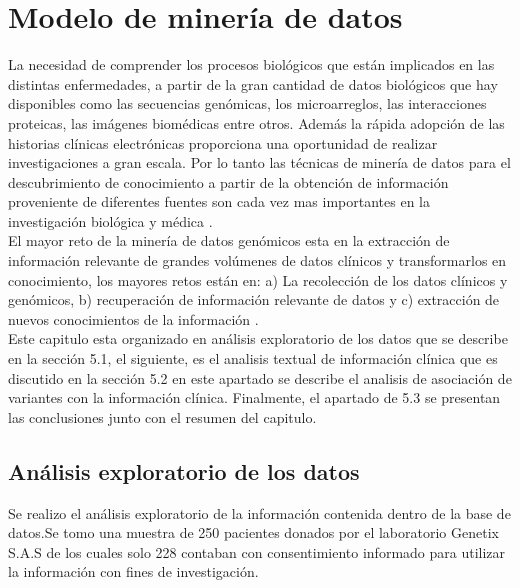 \chapter{Modelo de minería de datos}

La necesidad de comprender los procesos biológicos que están implicados en las distintas enfermedades, a partir de la gran cantidad de datos biológicos que hay disponibles como las secuencias genómicas, los microarreglos, las interacciones proteicas, las imágenes biomédicas entre otros. Además la rápida adopción de las historias clínicas electrónicas proporciona una oportunidad de realizar investigaciones a gran escala. Por lo tanto las técnicas de minería de datos para el descubrimiento de conocimiento a partir de la obtención de información proveniente de diferentes fuentes son cada vez mas importantes en la investigación biológica y médica \cite{Wang2017}.\\

El mayor reto de la minería de datos genómicos esta en la extracción de información relevante de grandes volúmenes de datos clínicos y transformarlos en conocimiento, los mayores retos están en: a) La recolección de los datos clínicos y genómicos, b) recuperación de información relevante de datos y c) extracción de nuevos conocimientos de la información \cite{Farid2016}. \\  

Este capitulo esta organizado en análisis exploratorio de los datos que se describe en la sección 5.1, el siguiente, es el analisis textual de información clínica que es discutido en la sección 5.2 en este apartado se describe el analisis de asociación de variantes con la información clínica. Finalmente, el apartado de 5.3 se presentan las conclusiones junto con el resumen del capitulo. 

\section{Análisis exploratorio de los datos}

Se realizo el análisis exploratorio de la información contenida dentro de la base de datos.Se tomo una muestra de 250 pacientes donados por el laboratorio Genetix S.A.S de los cuales solo 228 contaban con consentimiento informado para utilizar la información con fines de investigación.\\ 

